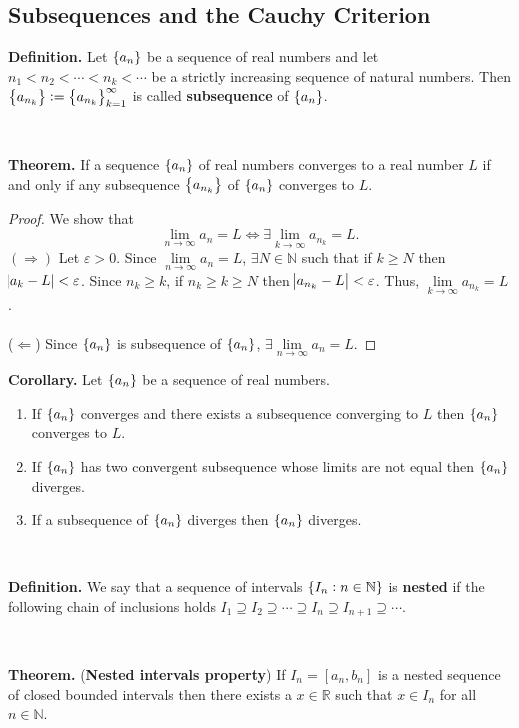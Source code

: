 \documentclass[12pt,a4paper]{article}
\begin{document}
\subsection{Subsequences and the Cauchy Criterion}
\begin{tcolorbox}[colback=white]
	\textbf{Definition.} Let $\set{a_n}$ be a sequence of real numbers and let $n_1<n_2<\cdots<n_k<\cdots$ be a strictly increasing sequence of natural numbers. Then $\set{a_{n_k}}:=\set{a_{n_k}}_{k=1}^\infty$ is called \textbf{subsequence} of $\set{a_n}$.
\end{tcolorbox}
\
\begin{tcolorbox}[colback=white]
	\textbf{Theorem.} If a sequence $\set{a_n}$ of real numbers converges to a real number $L$ if and only if any subsequence $\set{a_{n_k}}$ of $\set{a_n}$ converges to $L$.\tcblower\begin{proof}
		We show that \[
		\lim\limits_{n\to\infty}a_n=L\iff\exists\lim\limits_{k\to\infty}a_{n_k}=L.
		\] $(\Rightarrow)$ Let $\varepsilon>0$. Since $\lim\limits_{n\to\infty}a_n=L$, $\exists N\in\mathbb{N}$ such that if $k\geq N$ then $\abs{a_k-L}<\varepsilon$. Since $n_k\geq k$, if $n_k\geq k\geq N$ then $\abs{a_{n_k}-L}<\varepsilon$. Thus, $\lim\limits_{k\to\infty}a_{n_k}=L$.  \\
		\\
		($\Leftarrow$) Since $\set{a_n}$ is subsequence of $\set{a_n}$, $\exists\lim\limits_{n\to\infty}a_n=L$.
	\end{proof}
\end{tcolorbox}
\begin{tcolorbox}[colback=white]
	\textbf{Corollary.} Let $\set{a_n}$ be a sequence of real numbers. \begin{enumerate}
		\item If $\set{a_n}$ converges and there exists a subsequence converging to $L$ then $\set{a_n}$ converges to $L$.
		\item If $\set{a_n}$ has two convergent subsequence whose limits are not equal then $\set{a_n}$
		diverges.
		\item If a subsequence of $\set{a_n}$ diverges then $\set{a_n}$ diverges.
	\end{enumerate}
\end{tcolorbox}
\
\begin{tcolorbox}[colback=white]
	\textbf{Definition.} We say that a sequence of intervals $\set{I_n:n\in\mathbb{N}}$ is \textbf{nested} if the following chain of inclusions holds $I_1\supseteq I_2\supseteq\cdots\supseteq I_n\supseteq I_{n+1}\supseteq\cdots$.
\end{tcolorbox}
\
\begin{tcolorbox}[colback=white]
	\textbf{Theorem.} (\textbf{Nested intervals property}) If $I_n=[a_n,b_n]$ is a nested sequence of closed bounded intervals then there exists a $x\in\mathbb{R}$ such that $x\in I_n$ for all $n\in\mathbb{N}$.
\end{tcolorbox}
\end{document}
